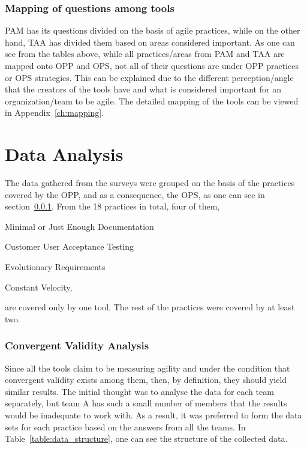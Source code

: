\subsubsection{Mapping of questions among tools}
\label{subsubsec:mapping}

\ac{PAM} has its questions divided on the basis of agile practices, while on the other hand, \ac{TAA} has divided them based on areas considered important. As one can see from the tables above, while all practices/areas from \ac{PAM} and \ac{TAA} are mapped onto \ac{OPP} and \ac{OPS}, not all of their questions are under \ac{OPP} practices or \ac{OPS} strategies. This can be explained due to the different perception/angle that the creators of the tools have and what is considered important for an organization/team to be agile. The detailed mapping of the tools can be viewed in Appendix~\ref{ch:mapping}.


\section{Data Analysis}

The data gathered from the surveys were grouped on the basis of the practices covered by the \ac{OPP}, and as a consequence, the \ac{OPS}, as one can see in section~\ref{subsubsec:mapping}. From the 18 practices in total, four of them, \begin{inparaenum} [a\upshape)] \item Minimal or Just Enough Documentation \item Customer User Acceptance Testing \item Evolutionary Requirements \item Constant Velocity, \end{inparaenum} are covered only by one tool. The rest of the practices were covered by at least two.

\subsubsection{Convergent Validity Analysis}
\label{subsubsec:convergent_validity_analysis}
Since all the tools claim to be measuring agility and under the condition that convergent validity exists among them, then, by definition, they should yield similar results. The initial thought was to analyse the data for each team separately, but team A has such a small number of members that the results would be inadequate to work with. As a result, it was preferred to form the data sets for each practice based on the answers from all the teams. In Table~\ref{table:data_structure}, one can see the structure of the collected data.

